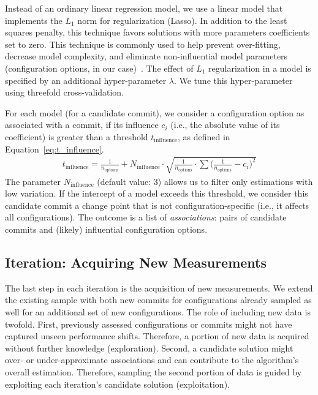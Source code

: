 \documentclass[sigconf]{acmart}
\begin{document}
	Instead of an ordinary linear regression model, we use a linear model that implements the $L_1$ norm for regularization (Lasso). In addition to the least squares penalty, this technique favors solutions with more parameters coefficients set to zero.
	This technique is commonly used to help prevent over-fitting, decrease model complexity, and eliminate non-influential model parameters (configuration options, in our case)~\cite{lasso}. The effect of $L_1$ regularization in a model is specified by an additional hyper-parameter $\lambda$. We tune this hyper-parameter using threefold cross-validation.
	
	For each model (for a candidate commit), we consider a configuration option as associated with a commit, if its influence $c_i$ (i.e., the absolute value of its coefficient) is greater than a threshold $t_\text{influence}$, as defined in Equation~\ref{eq:t_influence}.
	\begin{equation}
	\begin{gathered}
		t_\text{influence} = \frac{1}{n_\text{options}} + N_\text{influence} \cdot \sqrt{\frac{1}{n_\text{options}} \cdot \sum \Big(\frac{1}{n_\text{options}} - c_i\Big)^2}
		\label{eq:t_influence}
	\end{gathered}
	\end{equation}
	The parameter $N_\text{influence}$ (default value: 3) allows us to filter only estimations with low variation. If the intercept of a model exceeds this threshold, we consider this candidate commit a change point that is not configuration-specific (i.e., it affects all configurations). The outcome is a list of \emph{associations}: pairs of candidate commits and (likely) influential configuration options. 
	
	\subsection{Iteration: Acquiring New Measurements}\label{sec:acquisition}
 	The last step in each iteration is the acquisition of new measurements. We extend the existing sample with both new commits for configurations already sampled as well for an additional set of new configurations. The role of including new data is twofold. First, previously assessed configurations or commits might not have captured unseen performance shifts. Therefore, a portion of new data is acquired without further knowledge (exploration). Second, a candidate solution might over- or under-approximate associations and can contribute to the algorithm's overall estimation. Therefore, sampling the second portion of data is guided by exploiting each iteration's candidate solution (exploitation).
 	
\end{document}
